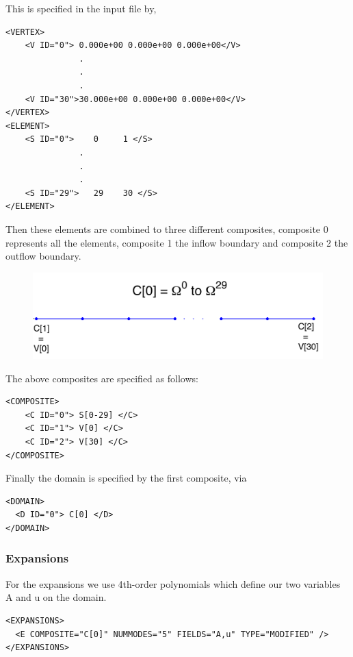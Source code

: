 This is specified in the input file by,

\begin{lstlisting}[style=XmlStyle]
<VERTEX>
    <V ID="0"> 0.000e+00 0.000e+00 0.000e+00</V>
               .
               .
               . 
    <V ID="30">30.000e+00 0.000e+00 0.000e+00</V>
</VERTEX>
<ELEMENT>
    <S ID="0">    0     1 </S>
               .
               .
               . 
    <S ID="29">   29    30 </S>
</ELEMENT>
\end{lstlisting}

Then these elements are combined to three different composites, composite 0
represents all the elements, composite 1 the inflow boundary and composite 2 the
outflow boundary.

\begin{figure}
	\centering
	\includegraphics[width=\linewidth]{Figures/Composite.png}
\end{figure}

The above composites are specified as follows:
\begin{lstlisting}[style=XmlStyle]
<COMPOSITE>
    <C ID="0"> S[0-29] </C>
    <C ID="1"> V[0] </C>
    <C ID="2"> V[30] </C>
</COMPOSITE>
\end{lstlisting}

Finally the domain is specified by the first composite, via
\begin{lstlisting}[style=XmlStyle]
<DOMAIN> 
  <D ID="0"> C[0] </D>
</DOMAIN>
\end{lstlisting}

\subsubsection{Expansions}

For the expansions we use 4th-order polynomials which define our two variables A
and u on the domain.

\begin{lstlisting}[style=XmlStyle]
<EXPANSIONS>
  <E COMPOSITE="C[0]" NUMMODES="5" FIELDS="A,u" TYPE="MODIFIED" />
</EXPANSIONS>
\end{lstlisting}

